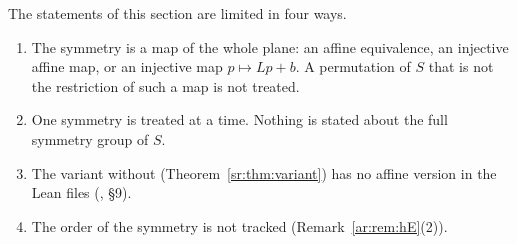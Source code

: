 \begin{remark}\label{ar:rem:scope}
The statements of this section are limited in four ways.
\begin{enumerate}[label=(\arabic*)]
\item The symmetry is a map of the whole plane: an affine equivalence, an injective affine map, or an injective map
$p\mapsto Lp+b$. A permutation of $S$ that is not the restriction of such a map is not treated.
\item One symmetry is treated at a time. Nothing is stated about the full symmetry group of $S$.
\item The variant without  (Theorem~\ref{sr:thm:variant}) has no affine version in the Lean files
(, \S9).
\item The order of the symmetry is not tracked (Remark~\ref{ar:rem:hE}(2)).
\end{enumerate}
\end{remark}

